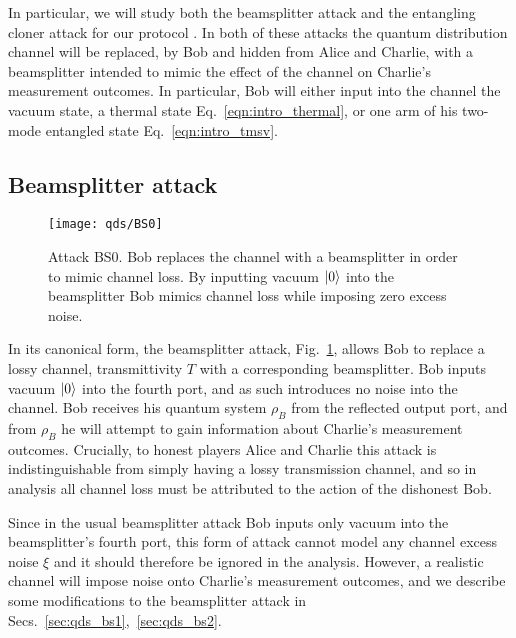

In particular, we will study both the beamsplitter attack and the entangling cloner attack for our protocol \cite{Grosshans2002, Grosshans2003}. In both of these attacks the quantum distribution channel will be replaced, by Bob and hidden from Alice and Charlie, with a beamsplitter intended to mimic the effect of the channel on Charlie's measurement outcomes. In particular, Bob will either input into the channel the vacuum state, a thermal state Eq.~\ref{eqn:intro_thermal}, or one arm of his two-mode entangled state Eq.~\ref{eqn:intro_tmsv}.

\subsection{Beamsplitter attack}

\begin{figure}[htp]
\centering
\texttt{[image: qds/BS0]}
\caption{\label{fig:bs0_attack} Attack BS$0$. Bob replaces the channel with a beamsplitter in order to mimic channel loss. By inputting vacuum $\ket{0}$ into the beamsplitter Bob mimics channel loss while imposing zero excess noise.}
\end{figure}
In its canonical form, the beamsplitter attack, Fig.~\ref{fig:bs0_attack}, allows Bob to replace a lossy channel, transmittivity $T$ with a corresponding beamsplitter. Bob inputs vacuum $\ket{0}$ into the fourth port, and as such introduces no noise into the channel. Bob receives his quantum system $\rho_B$ from the reflected output port, and from $\rho_B$ he will attempt to gain information about Charlie's measurement outcomes. Crucially, to honest players Alice and Charlie this attack is indistinguishable from simply having a lossy transmission channel, and so in analysis all channel loss must be attributed to the action of the dishonest Bob. 

Since in the usual beamsplitter attack Bob inputs only vacuum into the beamsplitter's fourth port, this form of attack cannot model any channel excess noise $\xi$ and it should therefore be ignored in the analysis. However, a realistic channel will impose noise onto Charlie's measurement outcomes, and we describe some modifications to the beamsplitter attack in Secs.~\ref{sec:qds_bs1},~\ref{sec:qds_bs2}. 

